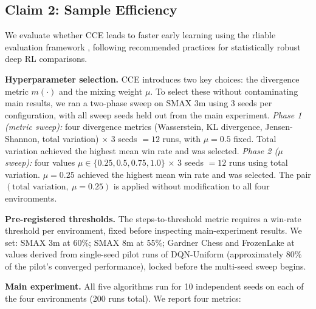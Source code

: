 \documentclass[conference]{IEEEtran}
\begin{document}
\subsection{Claim 2: Sample Efficiency}

\noindent We evaluate whether CCE leads to faster early learning using the rliable evaluation framework \cite{agarwal2021deep}, following recommended practices for statistically robust deep RL comparisons.

\textbf{Hyperparameter selection.} CCE introduces two key choices: the divergence metric $m(\cdot)$ and the mixing weight $\mu$. To select these without contaminating main results, we ran a two-phase sweep on SMAX 3m using 3 seeds per configuration, with all sweep seeds held out from the main experiment. \emph{Phase 1 (metric sweep):} four divergence metrics (Wasserstein, KL divergence, Jensen-Shannon, total variation) $\times$ 3 seeds $= 12$ runs, with $\mu = 0.5$ fixed. Total variation achieved the highest mean win rate and was selected. \emph{Phase 2 ($\mu$ sweep):} four values $\mu \in \{0.25, 0.5, 0.75, 1.0\}$ $\times$ 3 seeds $= 12$ runs using total variation. $\mu = 0.25$ achieved the highest mean win rate and was selected. The pair $(\text{total variation},\ \mu{=}0.25)$ is applied without modification to all four environments.

\textbf{Pre-registered thresholds.} The steps-to-threshold metric requires a win-rate threshold per environment, fixed before inspecting main-experiment results. We set: SMAX 3m at 60\%; SMAX 8m at 55\%; Gardner Chess and FrozenLake at values derived from single-seed pilot runs of DQN-Uniform (approximately 80\% of the pilot's converged performance), locked before the multi-seed sweep begins.

\textbf{Main experiment.} All five algorithms run for 10 independent seeds on each of the four environments (200 runs total). We report four metrics:
\end{document}
